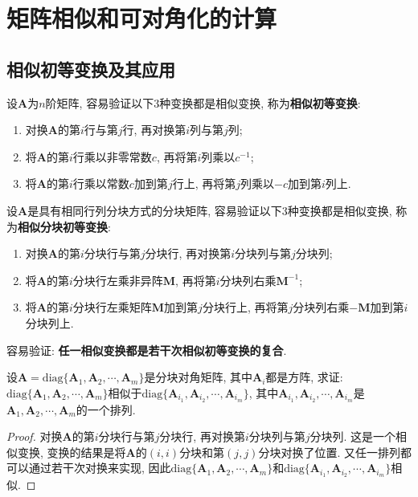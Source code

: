 \documentclass[../../main.tex]{subfiles}
\begin{document}
\section{矩阵相似和可对角化的计算}

\subsection{相似初等变换及其应用}

\begin{proposition}[相似初等变换]
设\(\boldsymbol{A}\)为\(n\)阶矩阵, 容易验证以下\(3\)种变换都是相似变换, 称为\textbf{相似初等变换}:
\begin{enumerate}
\item 对换\(\boldsymbol{A}\)的第\(i\)行与第\(j\)行, 再对换第\(i\)列与第\(j\)列;
\item 将\(\boldsymbol{A}\)的第\(i\)行乘以非零常数\(c\), 再将第\(i\)列乘以\(c^{-1}\);
\item 将\(\boldsymbol{A}\)的第\(i\)行乘以常数\(c\)加到第\(j\)行上, 再将第\(j\)列乘以\(-c\)加到第\(i\)列上.
\end{enumerate}

设\(\boldsymbol{A}\)是具有相同行列分块方式的分块矩阵, 容易验证以下\(3\)种变换都是相似变换, 称为\textbf{相似分块初等变换}:
\begin{enumerate}
\item 对换\(\boldsymbol{A}\)的第\(i\)分块行与第\(j\)分块行, 再对换第\(i\)分块列与第\(j\)分块列;
\item 将\(\boldsymbol{A}\)的第\(i\)分块行左乘非异阵\(\boldsymbol{M}\), 再将第\(i\)分块列右乘\(\boldsymbol{M}^{-1}\);
\item 将\(\boldsymbol{A}\)的第\(i\)分块行左乘矩阵\(\boldsymbol{M}\)加到第\(j\)分块行上, 再将第\(j\)分块列右乘\(-\boldsymbol{M}\)加到第\(i\)分块列上.
\end{enumerate}

容易验证: \textbf{任一相似变换都是若干次相似初等变换的复合}.
\end{proposition}


\begin{example}\label{example6.22}
设\(\boldsymbol{A}=\mathrm{diag}\{\boldsymbol{A}_{1},\boldsymbol{A}_{2},\cdots,\boldsymbol{A}_{m}\}\)是分块对角矩阵, 其中\(\boldsymbol{A}_{i}\)都是方阵, 求证: \(\mathrm{diag}\{\boldsymbol{A}_{1},\boldsymbol{A}_{2},\cdots,\boldsymbol{A}_{m}\}\)相似于\(\mathrm{diag}\{\boldsymbol{A}_{i_{1}},\boldsymbol{A}_{i_{2}},\cdots,\boldsymbol{A}_{i_{m}}\}\), 其中\(\boldsymbol{A}_{i_{1}},\boldsymbol{A}_{i_{2}},\cdots,\boldsymbol{A}_{i_{m}}\)是\(\boldsymbol{A}_{1},\boldsymbol{A}_{2},\cdots,\boldsymbol{A}_{m}\)的一个排列.
\end{example}
\begin{proof}
对换\(\boldsymbol{A}\)的第\(i\)分块行与第\(j\)分块行, 再对换第\(i\)分块列与第\(j\)分块列. 这是一个相似变换, 变换的结果是将\(\boldsymbol{A}\)的\((i,i)\)分块和第\((j,j)\)分块对换了位置. 又任一排列都可以通过若干次对换来实现, 因此\(\mathrm{diag}\{\boldsymbol{A}_{1},\boldsymbol{A}_{2},\cdots,\boldsymbol{A}_{m}\}\)和\(\mathrm{diag}\{\boldsymbol{A}_{i_{1}},\boldsymbol{A}_{i_{2}},\cdots,\boldsymbol{A}_{i_{m}}\}\)相似.
\end{proof}
\end{document}

